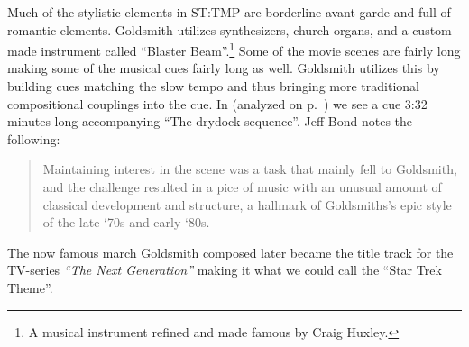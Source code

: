 Much of the stylistic elements in \ac{ST:TMP} are borderline avant-garde and full of romantic elements. Goldsmith utilizes synthesizers, church organs, and a custom made instrument called ``Blaster Beam''.\footnote{
A musical instrument refined and made famous by Craig Huxley.
}
Some of the movie scenes are fairly long making some of the musical cues fairly long as well. Goldsmith utilizes this by building cues matching the slow tempo and thus bringing more traditional compositional couplings into the cue. In  (analyzed on p.~\pageref{sec:leaving drydock}) we see a cue 3:32 minutes long accompanying ``The drydock sequence''. Jeff Bond notes the following: \blockquote[{\cite[88]{bond_music_1998}}]
{
Maintaining interest in the scene was a task that mainly fell to Goldsmith, and the challenge resulted in a pice of music with an unusual amount of classical development and structure, a hallmark of Goldsmiths's epic style of the late `70s and early `80s.
}  
The now famous march Goldsmith composed later became the title track for the TV-series \textit{``The Next Generation''} making it what we could call the ``Star Trek Theme''.

